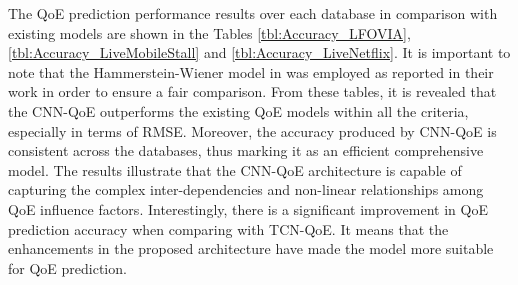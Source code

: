 The QoE prediction performance results over each database in comparison with existing models are shown in the Tables \ref{tbl:Accuracy_LFOVIA}, \ref{tbl:Accuracy_LiveMobileStall} and \ref{tbl:Accuracy_LiveNetflix}.
It is important to note that the Hammerstein-Wiener model in \cite{QoEModel_Wireless} was employed as reported in their work in order to ensure a fair comparison. 
From these tables, it is revealed that the CNN-QoE outperforms the existing QoE models within all the criteria, especially in terms of RMSE.
Moreover, the accuracy produced by CNN-QoE is consistent across the databases, thus marking it as an efficient comprehensive model.
The results illustrate that the CNN-QoE architecture is capable of capturing the complex inter-dependencies and non-linear relationships among QoE influence factors.
Interestingly, there is a significant improvement in QoE prediction accuracy when comparing with TCN-QoE.
It means that the enhancements in the proposed architecture have made the model more suitable for QoE prediction.
